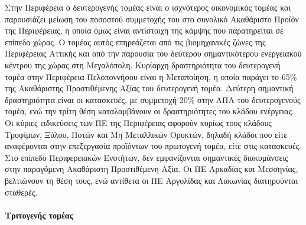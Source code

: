 \documentclass[12pt]{article}
\begin{document}
	Στην Περιφέρεια ο δευτερογενής τομέας είναι ο ισχνότερος οικονομικός τομέας και παρουσιάζει μείωση του ποσοστού συμμετοχής του στο συνολικό Ακαθάριστο Προϊόν της Περιφέρειας, η οποία όμως είναι αντίστοιχη της κάμψης που παρατηρείται σε επίπεδο χώρας. Ο τομέας αυτός επηρεάζεται από τις βιομηχανικές ζώνες της Περιφέρειας Αττικής και από την παρουσία του δεύτερου σημαντικότερου ενεργειακού κέντρου της χώρας στη Μεγαλόπολη. Κυρίαρχη δραστηριότητα του δευτερογενή τομέα στην Περιφέρεια Πελοποννήσου είναι η Μεταποίηση, η οποία παράγει το 65\% της Ακαθάριστης Προστιθέμενης Αξίας του δευτερογενή τομέα. Δεύτερη σημαντική δραστηριότητα είναι οι κατασκευές, με συμμετοχή 20\% στην ΑΠΑ του δευτερογενούς τομέα, ενώ την τρίτη θέση καταλαμβάνουν οι δραστηριότητες του κλάδου ενέργειας. Οι κύριες ειδικεύσεις των ΠΕ της Περιφέρειας αφορούν κυρίως τους κλάδους Τροφίμων, Ξύλου, Ποτών και Μη Μεταλλικών Ορυκτών, δηλαδή κλάδοι που είτε αναφέρονται στην επεξεργασία προϊόντων του πρωτογενή τομέα, είτε στις κατασκευές. Στο επίπεδο Περιφερειακών Ενοτήτων, δεν εμφανίζονται σημαντικές διακυμάνσεις στην παραγόμενη Ακαθάριστη Προστιθέμενη Αξία. Οι ΠΕ Αρκαδίας και Μεσσηνίας, βελτιώνουν τη θέση τους, ενώ αντίθετα οι ΠΕ Αργολίδας και Λακωνίας διατηρούνται σταθερές.
	
	\paragraph{Τριτογενής τομέας}
	
\end{document}
